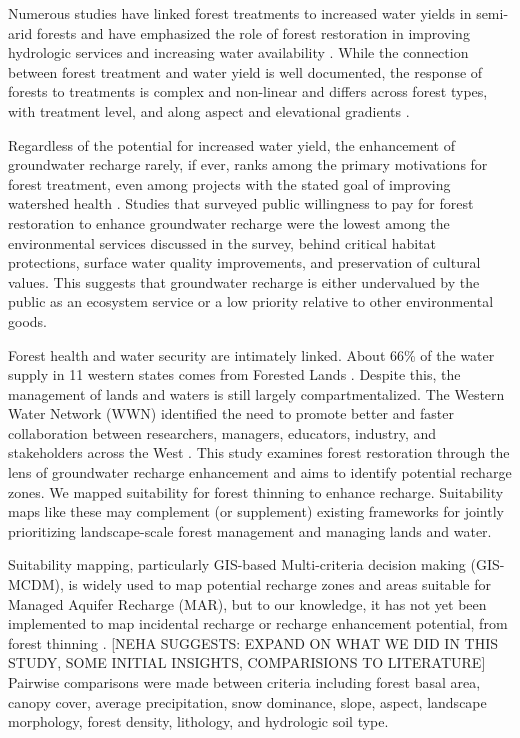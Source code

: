 \documentclass[
  number,
  preprint,
  3p,
  onecolumn]{elsarticle}
\begin{document}
Numerous studies have linked forest treatments to increased water yields
in semi-arid forests and have emphasized the role of forest restoration
in improving hydrologic services and increasing water availability
\citep{bosch_review_1982, baker_effects_1986, gottfried_moderate_1991, smerdon_overview_2009, zou_streamflow_2010, wyatt_estimating_2013, moreno_modeling_2015, simonit_impact_2015, wyatt_semiarid_2015, odonnell_forest_2018, schenk_impacts_2020, hibbert1979}.
While the connection between forest treatment and water yield is well
documented, the response of forests to treatments is complex and
non-linear and differs across forest types, with treatment level, and
along aspect and elevational gradients
\citep{del_campo_global_2022, biederman_streamflow_2022, zou_streamflow_2010, hibbert1979, moore_physical_2005}.

Regardless of the potential for increased water yield, the enhancement
of groundwater recharge rarely, if ever, ranks among the primary
motivations for forest treatment, even among projects with the stated
goal of improving watershed health
\citep{stanturf2014, filoso2017, allen_ecological_2002, friederici2013, odonnell2016}.
Studies that surveyed public willingness to pay for forest restoration
to enhance groundwater recharge were the lowest among the environmental
services discussed in the survey, behind critical habitat protections,
surface water quality improvements, and preservation of cultural
values\citep{mueller2019, soder2022}. This suggests that groundwater
recharge is either undervalued by the public as an ecosystem service or
a low priority relative to other environmental goods.

Forest health and water security are intimately linked. About 66\% of
the water supply in 11 western states comes from Forested Lands
\citep{brown_source_2005}. Despite this, the management of lands and
waters is still largely compartmentalized. The Western Water Network
(WWN) identified the need to promote better and faster collaboration
between researchers, managers, educators, industry, and stakeholders
across the West \citep{hansen2024}. This study examines forest
restoration through the lens of groundwater recharge enhancement and
aims to identify potential recharge zones. We mapped suitability for
forest thinning to enhance recharge. Suitability maps like these may
complement (or supplement) existing frameworks for jointly prioritizing
landscape-scale forest management and managing lands and water.

Suitability mapping, particularly GIS-based Multi-criteria decision
making (GIS-MCDM), is widely used to map potential recharge zones and
areas suitable for Managed Aquifer Recharge (MAR), but to our knowledge,
it has not yet been implemented to map incidental recharge or recharge
enhancement potential, from forest thinning
\citep{fathi2021, rajashekar2023, rahman2012}. {[}NEHA SUGGESTS: EXPAND
ON WHAT WE DID IN THIS STUDY, SOME INITIAL INSIGHTS, COMPARISIONS TO
LITERATURE{]} Pairwise comparisons were made between criteria including
forest basal area, canopy cover, average precipitation, snow dominance,
slope, aspect, landscape morphology, forest density, lithology, and
hydrologic soil type.
\end{document}
